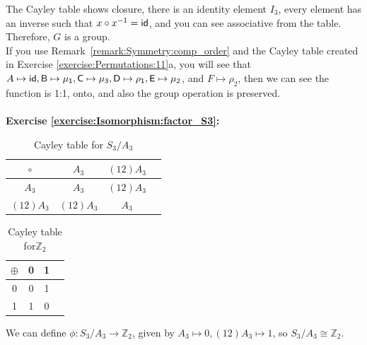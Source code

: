 \noindent
The Cayley table shows closure, there is an identity element $I_3$, every element has an inverse such that $x \circ x^{-1} = \sf{id}$, and you can see associative from the table. Therefore, $G$ is a group.  
\\
If you use Remark~\ref{remark:Symmetry:comp_order} and the Cayley table created in Exercise \ref{exercise:Permutations:11}a, you will see that $A \mapsto \sf{id}, B \mapsto \mu_1, C \mapsto \mu_3, D \mapsto \rho_1, E \mapsto \mu_2$, and $F \mapsto \rho_2$, then we can see the function is 1:1, onto, and also the group operation is preserved. 
\\
\\

\noindent\textbf{Exercise \ref{exercise:Isomorphism:factor_S3}:}
\begin{multicols}{2}
\begin{table}[H]
\caption{Cayley table for $S_3/A_3$}
{\small
\begin{center}
\begin{tabular}{c|ccc}
$\circ$ &$ A_3$ & $(12)A_3$  \\
\hline
$A_3$        &$A_3$ &$ (12)A_3$  \\
$(12)A_3$  & $(12)A_3$  &$A_3$   \\
\end{tabular}
\end{center}
}
\end{table}

\begin{table}[H]
\caption{Cayley table for${\mathbb Z}_2$}
{\small
\begin{center}
\begin{tabular}{c|ccc}
$\oplus$ & 0 & 1 \\

\hline
0 & 0 & 1 \\ 
1& 1 & 0 \\
\end{tabular}
\end{center}
}
\end{table}
\end{multicols}
\noindent We can define $\phi:S_3/A_3 \rightarrow {\mathbb Z}_2$,  given by  $A_3\mapsto 0,  (12)A_3 \mapsto 1$, so $S_3/A_3 \cong {\mathbb Z}_2$.
\\
\\

